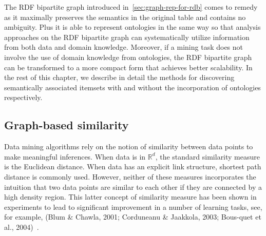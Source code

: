The RDF bipartite graph introduced in~\ref{sec:graph-rep-for-rdb} comes to remedy as it maximally preserves the semantics in the original table and contains no ambiguity. Plus it is able to represent ontologies in the same way so that analysis approaches on the RDF bipartite graph can systematically utilize information from both data and domain knowledge. Moreover, if a mining task does not involve the use of domain knowledge from ontologies, the RDF bipartite graph can be transformed to a more compact form that achieves better scalability. In the rest of this chapter, we describe in detail the methods for discovering semantically associated itemsets with and without the incorporation of ontologies respectively.

\subsection{Graph-based similarity}
Data mining algorithms rely on the notion of similarity between data points to make meaningful inferences. When data is in $\mathbb{R}^d$, the standard similarity measure is the Euclidean distance. When data has an explicit link structure, shortest path distance is commonly used. However, neither of these measures incorporates the intuition that two data points are similar to each other if they are connected by a high density region. This latter concept of similarity measure has been shown in experiments to lead to significant improvement in a number of learning tasks, see, for example, (Blum \& Chawla, 2001; Corduneanu \& Jaakkola, 2003; Bous-quet et al., 2004)~\cite{}.

